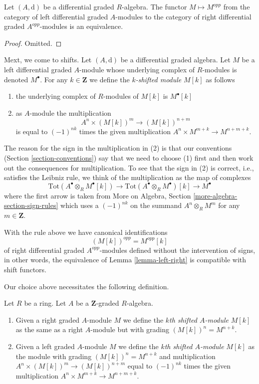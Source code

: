 \begin{lemma}
\label{lemma-left-right}
Let $(A, \text{d})$ be a differential graded $R$-algebra.
The functor $M \mapsto M^{opp}$ from the category of
left differential graded $A$-modules to the category of right
differential graded $A^{opp}$-modules is an equivalence.
\end{lemma}

\begin{proof}
Omitted.
\end{proof}

\noindent
Mext, we come to shifts. Let $(A, \text{d})$ be a differential graded algebra.
Let $M$ be a left differential graded $A$-module whose underlying complex
of $R$-modules is denoted $M^\bullet$.
For any $k \in \mathbf{Z}$ we define the {\it $k$-shifted module}
$M[k]$ as follows
\begin{enumerate}
\item the underlying complex of $R$-modules of $M[k]$ is $M^\bullet[k]$
\item as $A$-module the multiplication
$$
A^n \times (M[k])^m \longrightarrow (M[k])^{n + m}
$$
is equal to $(-1)^{nk}$ times the given multiplication
$A^n \times M^{m + k} \to M^{n + m + k}$.
\end{enumerate}
The reason for the sign in the multiplication in (2) is that our conventions
(Section \ref{section-conventions}) say that we need to choose (1) first
and then work out the consequences for multiplication. To see that the
sign in (2) is correct, i.e., satisfies the Leibniz rule, we think
of the multiplication as the map of complexes
$$
\text{Tot}(A^\bullet \otimes_R M^\bullet[k])
\to
\text{Tot}(A^\bullet \otimes_R M^\bullet)[k]
\to
M^\bullet
$$
where the first arrow is taken from
More on Algebra, Section \ref{more-algebra-section-sign-rules}
which uses a $(-1)^{nk}$ on the summand $A^n \otimes_R M^m$
for any $m \in \mathbf{Z}$.

\medskip\noindent
With the rule above we have canonical identifications
$$
(M[k])^{opp} = M^{opp}[k]
$$
of right differential graded $A^{opp}$-modules
defined without the intervention of signs, in other words, the equivalence
of Lemma \ref{lemma-left-right} is compatible with shift functors.

\medskip\noindent
Our choice above necessitates the following definition.

\begin{definition}
\label{definition-shift-graded-module}
Let $R$ be a ring. Let $A$ be a $\mathbf{Z}$-graded $R$-algebra.
\begin{enumerate}
\item Given a right graded $A$-module $M$ we define the
{\it $k$th shifted $A$-module} $M[k]$ as the same as
a right $A$-module but with grading $(M[k])^n = M^{n + k}$.
\item Given a left graded $A$-module $M$ we define the
{\it $k$th shifted $A$-module} $M[k]$ as the module
with grading $(M[k])^n = M^{n + k}$ and multiplication
$A^n \times (M[k])^m \to (M[k])^{n + m}$
equal to $(-1)^{nk}$ times the given multiplication
$A^n \times M^{m + k} \to M^{n + m + k}$.
\end{enumerate}
\end{definition}

